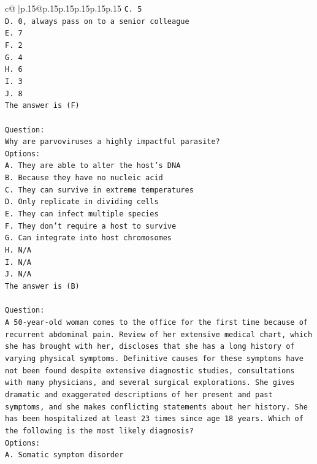 \documentclass{article}
\begin{document}
{\begin{supertabular}{c@{$\;$}|p{.15\linewidth}@{}p{.15\linewidth}p{.15\linewidth}p{.15\linewidth}p{.15\linewidth}p{.15\linewidth}}
{{{\texttt{C. 5} \\
\texttt{D. 0, always pass on to a senior colleague} \\
\texttt{E. 7} \\
\texttt{F. 2} \\
\texttt{G. 4} \\
\texttt{H. 6} \\
\texttt{I. 3} \\
\texttt{J. 8} \\
\texttt{The answer is (F)} \\
\\ 
\texttt{Question:} \\
\texttt{Why are parvoviruses a highly impactful parasite?} \\
\texttt{Options:} \\
\texttt{A. They are able to alter the host's DNA} \\
\texttt{B. Because they have no nucleic acid} \\
\texttt{C. They can survive in extreme temperatures} \\
\texttt{D. Only replicate in dividing cells} \\
\texttt{E. They can infect multiple species} \\
\texttt{F. They don't require a host to survive} \\
\texttt{G. Can integrate into host chromosomes} \\
\texttt{H. N/A} \\
\texttt{I. N/A} \\
\texttt{J. N/A} \\
\texttt{The answer is (B)} \\
\\ 
\texttt{Question:} \\
\texttt{A 50{-}year{-}old woman comes to the office for the first time because of recurrent abdominal pain. Review of her extensive medical chart, which she has brought with her, discloses that she has a long history of varying physical symptoms. Definitive causes for these symptoms have not been found despite extensive diagnostic studies, consultations with many physicians, and several surgical explorations. She gives dramatic and exaggerated descriptions of her present and past symptoms, and she makes conflicting statements about her history. She has been hospitalized at least 23 times since age 18 years. Which of the following is the most likely diagnosis?} \\
\texttt{Options:} \\
\texttt{A. Somatic symptom disorder} \\
}}}
\end{supertabular}}
\end{document}
